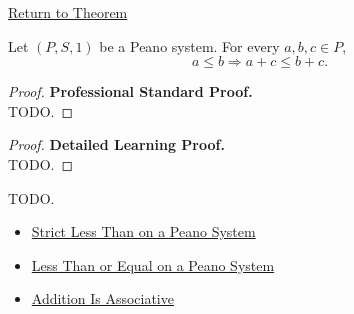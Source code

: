 \newpage
{}
\label{prf:addition-preserves-order-on-right}

\begin{remark*}[Return]
\hyperref[thm:addition-preserves-order-on-right]{Return to Theorem}
\end{remark*}

\begin{theorem*}
Let $(P,S,1)$ be a Peano system. For every $a,b,c \in P$,
\[
a \le b
\Longrightarrow
a+c \le b+c.
\]
\end{theorem*}

\begin{proof}
\textbf{Professional Standard Proof.}~\\
TODO.
\end{proof}

\begin{proof}
\textbf{Detailed Learning Proof.}~\\
TODO.
\end{proof}

\begin{remark*}
TODO.
\end{remark*}

\begin{dependencies}
\begin{itemize}
  \item \hyperref[def:strict-less-than-on-peano-system]{Strict Less Than on a Peano System}
  \item \hyperref[def:less-than-or-equal-on-peano-system]{Less Than or Equal on a Peano System}
  \item \hyperref[thm:addition-associative]{Addition Is Associative}
\end{itemize}
\end{dependencies}

